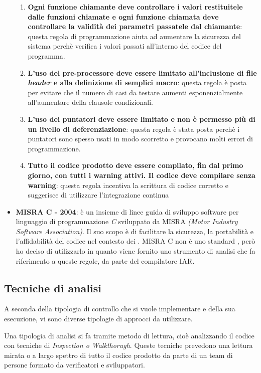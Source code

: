 \begin{itemize}
\begin{enumerate}
\item \textbf{Ogni funzione chiamante deve controllare i valori restituitele dalle funzioni chiamate e ogni funzione chiamata deve controllare la validità dei parametri passatele dal chiamante}: questa regola di programmazione aiuta ad aumentare la sicurezza del sistema perchè verifica i valori passati all'interno del codice del programma.

\item \textbf{L'uso del pre-processore deve essere limitato all'inclusione di file \textit{header} e alla definizione di semplici macro}: questa regola è posta per evitare che il numero di casi da testare aumenti esponenzialmente all'aumentare della clausole condizionali.

\item \textbf{L'uso dei puntatori deve essere limitato e non è permesso più di un livello di deferenziazione}: questa regola è stata posta perchè i puntatori sono spesso usati in modo scorretto e provocano molti errori di programmazione.

\item \textbf{Tutto il codice prodotto deve essere compilato, fin dal primo giorno, con tutti i warning attivi. Il codice deve compilare senza warning}: questa regola incentiva la scrittura di codice corretto e suggerisce di utilizzare l'integrazione continua
\end{enumerate} 

\item[] \textbf{MISRA C - 2004}: è un insieme di linee guida di sviluppo software per linguaggio di programmazione \textit{C} sviluppato da MISRA \textit{(Motor Industry Software Association)}. Il suo scopo è di facilitare la sicurezza, la portabilità e l'affidabilità del codice nel contesto dei .
MISRA C non è uno standard , però ho deciso di utilizzarlo in quanto viene fornito uno strumento di analisi che fa riferimento a queste regole, da parte del compilatore IAR.
\end{itemize}

\subsection{Tecniche di analisi}
A seconda della tipologia di controllo che si vuole implementare e della sua esecuzione, vi sono diverse tipologie di approcci da utilizzare.

Una tipologia di analisi si fa tramite metodo di lettura, cioè analizzando il codice con tecniche di \textit{Inspection o Walkthorugh}. Queste tecniche prevedono una lettura mirata o a largo spettro di tutto il codice prodotto da parte di un team di persone formato da verificatori e sviluppatori. 


